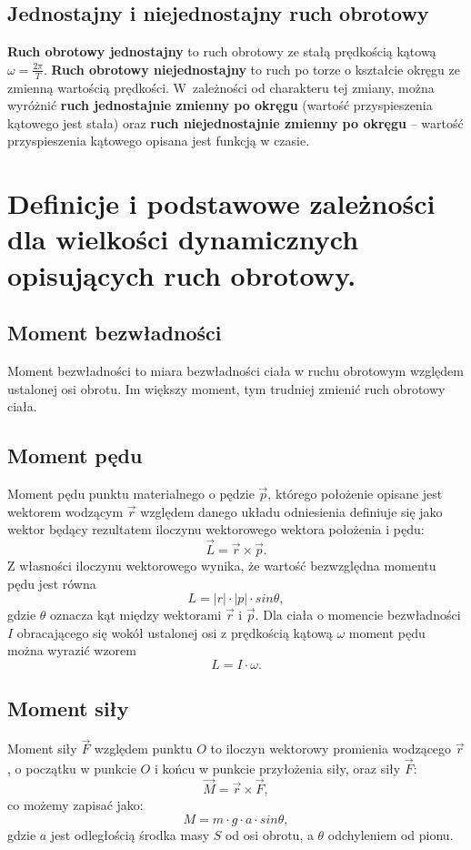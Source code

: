 \documentclass[a4paper,11pt]{article}
\begin{document}
\subsection{Jednostajny i niejednostajny ruch obrotowy}
\textbf{Ruch obrotowy jednostajny} to ruch obrotowy ze stałą prędkością kątową $\omega = \frac{2\pi}{T}$.
\textbf{Ruch obrotowy niejednostajny} to ruch po torze o kształcie okręgu ze zmienną wartością prędkości. W~zależności od charakteru tej zmiany, można wyróżnić \textbf{ruch jednostajnie zmienny po okręgu} (wartość przyspieszenia kątowego jest stała) oraz \textbf{ruch niejednostajnie zmienny po okręgu} – wartość przyspieszenia kątowego opisana jest funkcją w czasie.


\section{Definicje i podstawowe zależności dla wielkości dynamicznych opisujących ruch obrotowy.}

\subsection{Moment bezwładności}
Moment bezwładności to miara bezwładności ciała w ruchu obrotowym względem ustalonej osi obrotu. Im większy moment, tym trudniej zmienić ruch obrotowy ciała.

\subsection{Moment pędu} 
Moment pędu punktu materialnego o pędzie $\vec{p}$, którego położenie opisane jest wektorem wodzącym $\vec{r}$ względem danego układu odniesienia definiuje się jako wektor będący rezultatem iloczynu wektorowego wektora położenia i pędu:
$$\vec{L}=\vec{r} \times \vec{p}.$$
Z własności iloczynu wektorowego wynika, że wartość bezwzględna momentu pędu jest równa  
$$L=|r|\cdot |p| \cdot sin\theta,$$ 
gdzie $\theta$ oznacza kąt między wektorami $\vec{r}$ i $\vec{p}$. Dla ciała o momencie bezwładności $I$ obracającego się wokół ustalonej osi z prędkością kątową $\omega$ moment pędu można wyrazić wzorem  
$$L=I\cdot \omega.$$

\subsection{Moment siły} 
Moment siły $\vec{F}$ względem punktu $O$ to iloczyn wektorowy promienia wodzącego $\vec{r}$, o początku w punkcie $O$ i końcu w punkcie przyłożenia siły, oraz siły $\vec{F}$:  
$$\vec{M}=\vec{r} \times \vec{F},$$ 
co możemy zapisać jako:  
$$M=m\cdot g\cdot a\cdot sin\theta,$$ 
gdzie $a$ jest odległością środka masy $S$ od osi obrotu, a $\theta$ odchyleniem od pionu.
\end{document}
